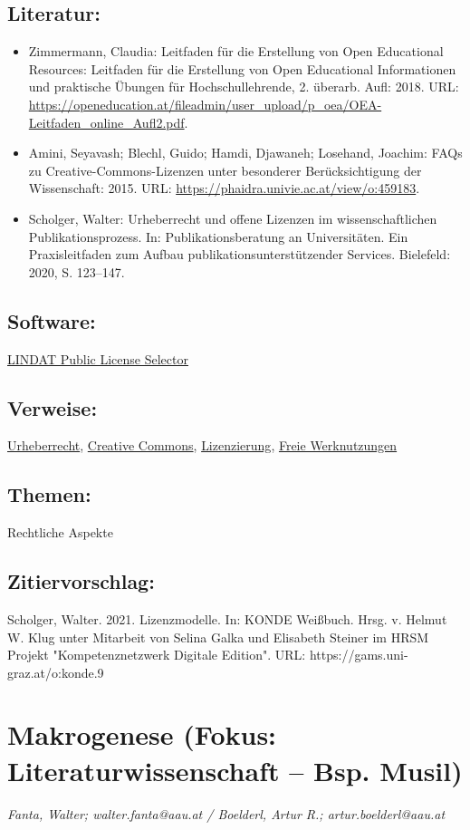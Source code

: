 \documentclass{article}
\begin{document}
        \subsection*{Literatur:}\begin{itemize}\item Zimmermann, Claudia: Leitfaden für die Erstellung von Open Educational
                              Resources: Leitfaden für die Erstellung von Open Educational
                              Informationen und praktische Übungen für Hochschullehrende, 2.
                              überarb. Aufl: 2018. URL: \url{https://openeducation.at/fileadmin/user_upload/p_oea/OEA-Leitfaden_online_Aufl2.pdf}.\item Amini, Seyavash; Blechl, Guido; Hamdi, Djawaneh; Losehand, Joachim: FAQs zu Creative-Commons-Lizenzen unter besonderer
                              Berücksichtigung der Wissenschaft: 2015. URL: \url{https://phaidra.univie.ac.at/view/o:459183}.\item Scholger, Walter: Urheberrecht und offene Lizenzen im wissenschaftlichen
                              Publikationsprozess. In: Publikationsberatung an Universitäten. Ein
                              Praxisleitfaden zum Aufbau publikationsunterstützender
                              Services. Bielefeld: 2020, S. 123–147.\end{itemize}\subsection*{Software:}\href{https://ufal.github.io/public-license-selector/}{LINDAT Public
                           License Selector}\subsection*{Verweise:}\href{https://gams.uni-graz.at/o:konde.44}{Urheberrecht}, \href{https://gams.uni-graz.at/o:konde.45}{Creative Commons}, \href{https://gams.uni-graz.at/o:konde.119}{Lizenzierung}, \href{https://gams.uni-graz.at/o:konde.222}{Freie Werknutzungen}\subsection*{Themen:}Rechtliche Aspekte\subsection*{Zitiervorschlag:}Scholger, Walter. 2021. Lizenzmodelle. In: KONDE Weißbuch. Hrsg. v. Helmut W. Klug unter Mitarbeit von Selina Galka und Elisabeth Steiner im HRSM Projekt "Kompetenznetzwerk Digitale Edition". URL: https://gams.uni-graz.at/o:konde.9\newpage\section*{Makrogenese (Fokus: Literaturwissenschaft – Bsp. Musil)} \emph{Fanta, Walter; walter.fanta@aau.at / Boelderl, Artur R.;
                  artur.boelderl@aau.at}\\
        
\end{document}
